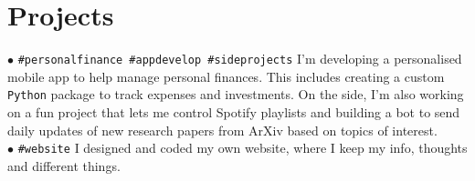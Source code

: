\documentclass[letterpaper]{twentysecondcv} %
\begin{document}

\section{Projects}

\iffalse
\begin{twentymedium} %
    \twentyitemmedium{research}{PostDoc Researcher \dots .}{}{}
    \twentyitemmedium{website}{I created \dots .}{}{}
    \twentyitemmedium{app}{I am developing.}{}{}
    \twentyitemmedium{personal\\finance}{I created a package \dots .}{}{}
\end{twentymedium}
\fi

$\bullet$ \texttt{\#personalfinance \#appdevelop \#sideprojects}
          {\small 
          I'm developing a personalised mobile app to help manage personal finances. This includes creating a custom \texttt{Python} package to track expenses and investments. On the side, I'm also working on a fun project that lets me control Spotify playlists and building a bot to send daily updates of new research papers from ArXiv based on topics of interest.
          }\\
$\bullet$ \texttt{\#website}   
          {\small I designed and coded my own website, where I keep my info, thoughts and different things.}



% 
\end{document}
